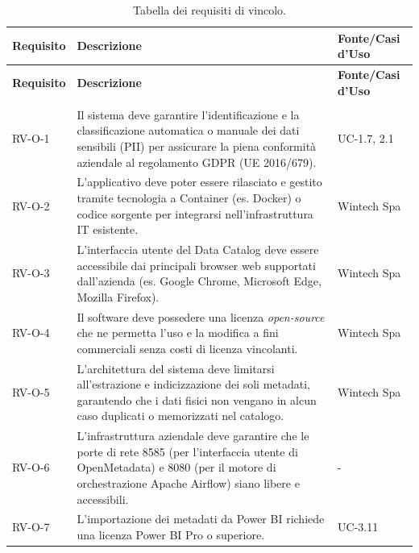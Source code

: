 \begin{longtable}{ p{} p{} p{} }
\toprule
\textbf{Requisito} & \textbf{Descrizione} & \textbf{Fonte/Casi d'Uso} \\
\midrule
\endfirsthead

\toprule
\textbf{Requisito} & \textbf{Descrizione} & \textbf{Fonte/Casi d'Uso} \\
\midrule
\endhead

\midrule
\noalign{\vspace{10pt}}
\caption[]{Tabella dei requisiti di vincolo.} \\
\endfoot

\bottomrule
\noalign{\vspace{10pt}}
\caption{Tabella dei requisiti di vincolo.}
\label{tab:requisiti-vincolo}
\endlastfoot

RV-O-1 & Il sistema deve garantire l'identificazione e la classificazione automatica o manuale dei dati sensibili (PII) per assicurare la piena conformità aziendale al regolamento GDPR (UE 2016/679). & UC-1.7, 2.1 \\ \midrule
RV-O-2 & L'applicativo deve poter essere rilasciato e gestito tramite tecnologia a Container (es. Docker) o codice sorgente per integrarsi nell'infrastruttura IT esistente. & Wintech Spa \\ \midrule
RV-O-3 & L'interfaccia utente del Data Catalog deve essere accessibile dai principali browser web supportati dall'azienda (es. Google Chrome, Microsoft Edge, Mozilla Firefox). & Wintech Spa \\ \midrule
RV-O-4 & Il software deve possedere una licenza \emph{open-source} che ne permetta l'uso e la modifica a fini commerciali senza costi di licenza vincolanti. & Wintech Spa \\ \midrule
RV-O-5 & L'architettura del sistema deve limitarsi all'estrazione e indicizzazione dei soli metadati, garantendo che i dati fisici non vengano in alcun caso duplicati o memorizzati nel catalogo. & Wintech Spa \\ \midrule
RV-O-6 & L'infrastruttura aziendale deve garantire che le porte di rete 8585 (per l'interfaccia utente di OpenMetadata) e 8080 (per il motore di orchestrazione Apache Airflow) siano libere e accessibili. & - \\ \midrule
RV-O-7 & L'importazione dei metadati da Power BI richiede una licenza Power BI Pro o superiore. & UC-3.11 \\
\end{longtable}



